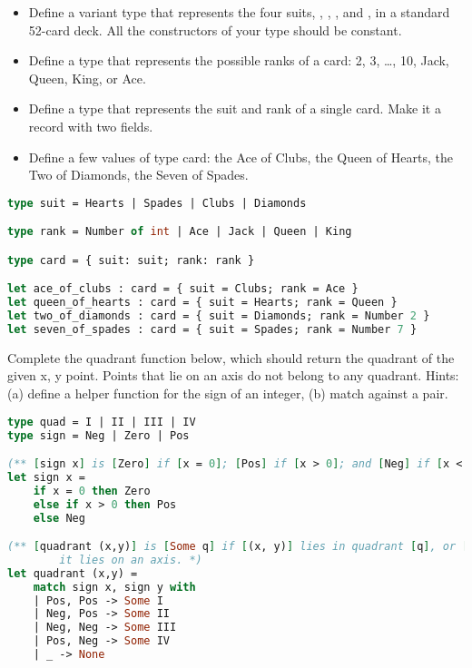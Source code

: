 \problem[cards]
\begin{itemize}
  \item Define a variant type  that represents the four suits, , , , and , in a standard 52-card deck. All the constructors of your type should be constant.
  \item Define a type  that represents the possible ranks of a card: 2, 3, \ldots, 10, Jack, Queen, King, or Ace.
  \item Define a type  that represents the suit and rank of a single card. Make it a record with two fields.
  \item Define a few values of type card: the Ace of Clubs, the Queen of Hearts, the Two of Diamonds, the Seven of Spades.
\end{itemize}

\begin{lstlisting}[language=OCaml]
type suit = Hearts | Spades | Clubs | Diamonds

type rank = Number of int | Ace | Jack | Queen | King

type card = { suit: suit; rank: rank }

let ace_of_clubs : card = { suit = Clubs; rank = Ace }
let queen_of_hearts : card = { suit = Hearts; rank = Queen }
let two_of_diamonds : card = { suit = Diamonds; rank = Number 2 }
let seven_of_spades : card = { suit = Spades; rank = Number 7 }
\end{lstlisting}

\problem[quadrant]
Complete the quadrant function below, which should return the quadrant of the given x, y point. Points that lie on an axis do not belong to any quadrant. Hints: (a) define a helper function for the sign of an integer, (b) match against a pair.

\begin{lstlisting}[language=OCaml]
type quad = I | II | III | IV
type sign = Neg | Zero | Pos

(** [sign x] is [Zero] if [x = 0]; [Pos] if [x > 0]; and [Neg] if [x < 0]. *)
let sign x =
	if x = 0 then Zero
	else if x > 0 then Pos
	else Neg

(** [quadrant (x,y)] is [Some q] if [(x, y)] lies in quadrant [q], or [None] if
		it lies on an axis. *)
let quadrant (x,y) =
	match sign x, sign y with
	| Pos, Pos -> Some I
	| Neg, Pos -> Some II
	| Neg, Neg -> Some III
	| Pos, Neg -> Some IV
	| _ -> None
\end{lstlisting}


